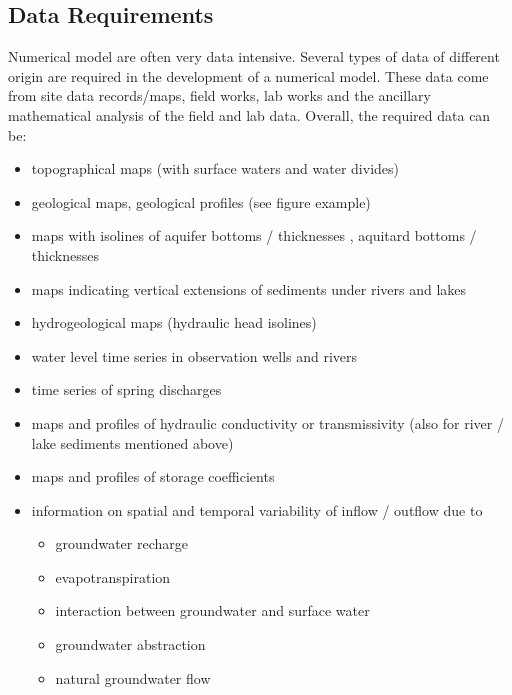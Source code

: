 \documentclass[letterpaper,10pt,english]{jupyterBook}
\begin{document}
\subsection{Data Requirements}
\label{\detokenize{content/modeling/31_intro_modeling:data-requirements}}
\sphinxAtStartPar
Numerical model are often very data intensive. Several types of data of different origin are required in the development of a numerical model. These data come from site data records/maps, field works, lab works and the ancillary mathematical analysis of the field and lab data. Overall, the required data can be:
\begin{itemize}
\item {} 
\sphinxAtStartPar
topographical maps (with surface waters and water divides)

\item {} 
\sphinxAtStartPar
geological maps, geological profiles (see figure  example)

\item {} 
\sphinxAtStartPar
maps with isolines of aquifer bottoms / thicknesses , aquitard bottoms / thicknesses

\item {} 
\sphinxAtStartPar
maps indicating vertical extensions of sediments under rivers and lakes

\item {} 
\sphinxAtStartPar
hydrogeological maps (hydraulic head isolines)

\item {} 
\sphinxAtStartPar
water level time series in observation wells and rivers

\item {} 
\sphinxAtStartPar
time series of spring discharges

\item {} 
\sphinxAtStartPar
maps and profiles of hydraulic conductivity or transmissivity (also for river / lake sediments mentioned above)

\item {} 
\sphinxAtStartPar
maps and profiles of storage coefficients

\item {} 
\sphinxAtStartPar
information on spatial and temporal variability of inflow / outflow due to
\begin{itemize}
\item {} 
\sphinxAtStartPar
groundwater recharge

\item {} 
\sphinxAtStartPar
evapotranspiration

\item {} 
\sphinxAtStartPar
interaction between groundwater and surface water

\item {} 
\sphinxAtStartPar
groundwater abstraction

\item {} 
\sphinxAtStartPar
natural groundwater flow

\end{itemize}

\end{itemize}
\end{document}
